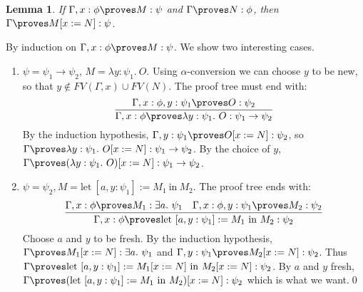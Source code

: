 \documentclass{LMCS}
\newtheorem{lemma}[thm]{Lemma}
\newcommand{\p}{\proves}
\newcommand{\g}{\Gamma}
\newcommand{\gp}{\Gamma \proves}
\newcommand{\pl}[1]{\ensuremath{\mathrm{#1}}}
\newcommand{\LET}{\pl{let}}
\newcommand{\IN}{\pl{in}}
\begin{document}
\begin{lemma}\label{lamsl}
If $\Gamma, x : \phi \proves M : \psi$ and  $\Gamma \proves N : \phi$, then
$\Gamma \proves M[x:=N] : \psi$.
\end{lemma}
\proof By induction on $\g, x : \phi \p  M : \psi$. We show two interesting cases.
\begin{enumerate}[$\bullet$]
\item $\psi = \psi_1 \to \psi_2$, $M = \lambda y : \psi_1.\ O$. Using $\alpha$-conversion 
we can choose $y$ to be new, so that $y \notin FV(\g, x) \cup FV(N)$. The
proof tree must end with:
\[
\infer{\g, x : \phi \p \lambda y : \psi_1.\ O : \psi_1 \to \psi_2}{\g, x :
\phi, y : \psi_1 \p O : \psi_2}
\]
By the induction hypothesis, $\g, y : \psi_1 \p O[x:=N] : \psi_2$, so $\g \p \lambda y : \psi_1.\ O[x:=N] : \psi_1
\to \psi_2$. By the choice of $y$, $\gp (\lambda y : \psi_1.\ O)[x:=N] :
\psi_1 \to \psi_2$. 
\item $\psi = \psi_2, M = \LET\ [a, y : \psi_1] := M_1\ \IN\ M_2$. The proof tree ends with:
\[
\infer{\g, x : \phi \p \LET\ [a, y : \psi_1] := M_1\ \IN\
M_2 : \psi_2}{\g, x : \phi \p M_1 : \exists a.\ \psi_1 & \g, x : \phi, y : \psi_1 \p M_2
: \psi_2}
\]
Choose $a$ and $y$ to be fresh. By the induction hypothesis, $\gp M_1[x:=N] : \exists a.\ \psi_1$ and $\g, y
: \psi_1 \p M_2[x:=N] : \psi_2$. Thus $\gp \LET\ [a, y : \psi_1] :=
M_1[x:=N]\ \IN\ M_2[x:=N] : \psi_2$. By $a$ and $y$ fresh, $\gp (\LET\ [a, y : \psi_1] :=
M_1\ \IN\ M_2)[x:=N] : \psi_2$ which is what we want.\qed 
\end{enumerate}
\end{document}
